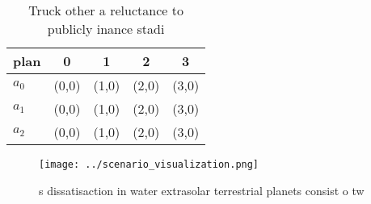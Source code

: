 \documentclass[a4paper]{article}
\begin{document}
\begin{table}
\begin{adjustbox}{width=0.6\columnwidth}
\begin{tabular}{|l|l|l|l|l|}
\hline
\textbf{plan} & \multicolumn{1}{c|}{\textbf{0}} & \multicolumn{1}{c|}{\textbf{1}} & \multicolumn{1}{c|}{\textbf{2}} & \multicolumn{1}{c|}{\textbf{3}} \\ \hline
\textbf{$a_0$}  & (0,0) & (1,0) & (2,0) & (3,0) \\ \hline
\textbf{$a_1$}  & (0,0) & (1,0) & (2,0) & (3,0) \\ \hline
\textbf{$a_2$}  & (0,0) & (1,0) & (2,0) & (3,0) \\ \hline
\end{tabular}
\end{adjustbox}
\caption{Truck other a reluctance to publicly inance stadi
}
\end{table}

\begin{figure}
\centering
\texttt{[image: ../scenario\_visualization.png]}
\caption{s dissatisaction in water extrasolar terrestrial planets consist o tw
}
\end{figure}
 
\end{document}
